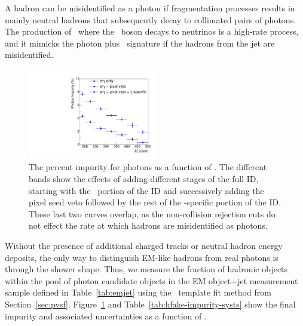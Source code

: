 A hadron can be misidentified as a photon if fragmentation processes results in mainly neutral hadrons that subsequently decay to collimated pairs of photons.
The production of \zj\ where the \PZ\ boson decays to neutrinos is a high-rate process, and it mimicks the photon plus \met\ signature if the hadrons from the jet are misidentified.

\begin{figure}[htbp]
  \centering
  \includegraphics[width=0.5\textwidth]{Analysis/Figures/hfake/plot_impurity_barrel_medium.pdf}
  \caption{
    The percent impurity for photons as a function of \pt. 
    The different bands show the effects of adding different stages of the full ID, starting with the \egamma\ portion of the ID and successively adding the pixel seed veto followed by the rest of the \Pgg-specific portion of the ID.
    These last two curves overlap, as the non-collision rejection cuts do not effect the rate at which hadrons are misidentified as photons.
  }
  \label{fig:impurity-compsb}
\end{figure}

Without the presence of additional charged tracks or neutral hadron energy deposits, the only way to distinguish EM-like hadrons from real photons is through the shower shape. 
Thus, we measure the fraction of hadronic objects within the pool of photon candidate objects in the EM object+jet measurement sample defined in Table~\ref{tab:emjet} using the \sieie\ template fit method from Section~\ref{sec:pvsf}.
Figure~\ref{fig:impurity-compsb} and Table~\ref{tab:hfake-impurity-systs} show the final impurity and associated uncertainties as a function of \pt. 

